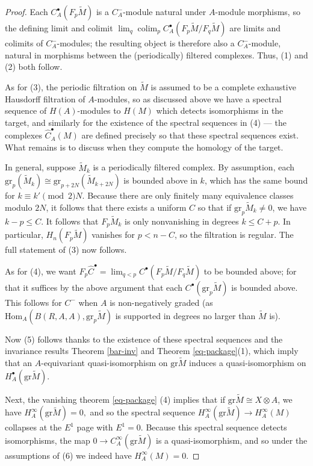 \documentclass{memo-l}
\DeclareMathOperator{\colim}{colim}
\theoremstyle{definition}
\theoremstyle{remark}
\numberwithin{section}{chapter}
\numberwithin{equation}{chapter}
\begin{document}
\begin{proof}
Each $C^\bullet_A(F_p \tilde M)$ is a $C^-_A$-module natural under $A$-module morphisms, so the defining limit and colimit $\lim_q \colim_p C^\bullet_A(F_p \tilde M/F_q \tilde M)$ are limits and colimits of $C^-_A$-modules; the resulting object is therefore also a $C^-_A$-module, natural in morphisms between the (periodically) filtered complexes. Thus, (1) and (2) both follow.

As for (3), the periodic filtration on $\tilde M$ is assumed to be a complete exhaustive Hausdorff filtration of $A$-modules, so as discussed above we have a spectral sequence of $H(A)$-modules to $H(M)$ which detects isomorphisms in the target, and similarly for the existence of the spectral sequences in (4) --- the complexes $\hat C^\bullet_A(M)$ are defined precisely so that these spectral sequences exist. What remains is to discuss when they compute the homology of the target. 

In general, suppose $\tilde M_k$ is a periodically filtered complex. By assumption, each $\text{gr}_p(\tilde M_k) \cong \text{gr}_{p+2N}(\tilde M_{k+2N})$ is bounded above in $k$, which has the same bound for $k \equiv k' \pmod 2N$. Because there are only finitely many equivalence classes modulo $2N$, it follows that there exists a uniform $C$ so that if $\text{gr}_p \tilde M_k \ne 0$, we have $k - p \le C$. It follows that $F_p \tilde M_k$ is only nonvanishing in degrees $k \le C + p$. In particular, $H_n(F_p \tilde M)$ vanishes for $p < n - C$, so the filtration is regular. The full statement of (3) now follows. 

As for (4), we want $F_p \hat C^\bullet = \lim_{q < p} C^\bullet(F_p \tilde M/F_q \tilde M)$ to be bounded above; for that it suffices by the above argument that each $C^\bullet(\text{gr}_p \tilde M)$ is bounded above. This follows for $C^-$ when $A$ is non-negatively graded (as $\text{Hom}_A(B(R,A,A), \text{gr}_p \tilde M)$ is supported in degrees no larger than $\tilde M$ is).

Now (5) follows thanks to the existence of these spectral sequences and the invariance results Theorem \ref{bar-inv} and Theorem \ref{eq-package}(1), which imply that an $A$-equivariant quasi-isomorphism on $\text{gr} \tilde M$ induces a quasi-isomorphism on $H^\bullet_A(\text{gr} \tilde M)$. 

Next, the vanishing theorem \ref{eq-package} (4) implies that if $\text{gr} \tilde M \cong X \otimes A$, we have $H^\infty_A(\text{gr} \tilde M) = 0,$ and so the spectral sequence $H^\infty_A(\text{gr} \tilde M) \to H^\infty_A(M)$ collapses at the $E^1$ page with $E^1 = 0$. Because this spectral sequence detects isomorphisms, the map $0 \to C^\infty_A(\text{gr} \tilde M)$ is a quasi-isomorphism, and so under the assumptions of (6) we indeed have $H^\infty_A(M) = 0$. 


\end{proof}
\end{document}
